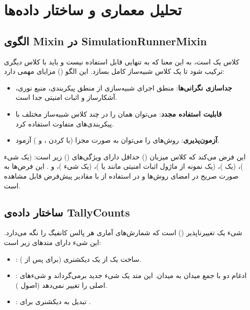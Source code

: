 \section{تحلیل معماری و ساختار داده‌ها}

\subsection{الگوی Mixin در SimulationRunnerMixin}

کلاس  یک  است، به این معنا که به تنهایی قابل استفاده نیست و باید با کلاس دیگری ترکیب شود تا یک کلاس شبیه‌ساز کامل بسازد. این الگو () مزایای مهمی دارد:

\begin{itemize}
	\item \textbf{جداسازی نگرانی‌ها}: منطق اجرای شبیه‌سازی از منطق پیکربندی، منبع نوری، آشکارساز و اثبات امنیتی جدا است.
	\item \textbf{قابلیت استفاده مجدد}: می‌توان همان  را در چند کلاس شبیه‌ساز مختلف با پیکربندی‌های متفاوت استفاده کرد.
	\item \textbf{آزمون‌پذیری}: روش‌های  را می‌توان به صورت مجزا (با  کردن ،  و ) آزمود.
\end{itemize}

این  فرض می‌کند که کلاس میزبان () حداقل دارای ویژگی‌های () زیر است:  (یک شیء )،  (یک )،  (یک نمونه از ماژول اثبات امنیتی مانند  یا )،  (یک شیء )،  و . این فرض‌ها به صورت صریح در امضای روش‌ها و در استفاده از  با مقادیر پیش‌فرض قابل مشاهده است.

\subsection{ساختار داده‌ی TallyCounts}

شیء  یک  تغییرناپذیر () است که شمارش‌های آماری هر پالس کانفیگ را نگه می‌دارد. این شیء دارای متدهای زیر است:

\begin{itemize}
	\item {}: ساخت یک  از یک دیکشنری (برای  پس از ).
	\item {}: ادغام دو  با جمع میدان به میدان. این متد یک شیء جدید برمی‌گرداند و شیءهای اصلی را تغییر نمی‌دهد (اصول ).
	\item {}: تبدیل به دیکشنری برای .
\end{itemize}

